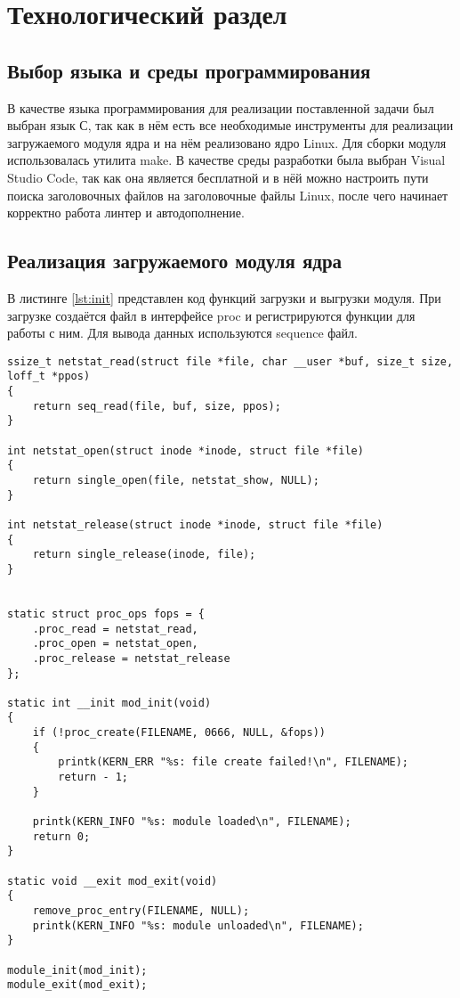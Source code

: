 \chapter{Технологический раздел}

\section{Выбор языка и среды программирования}

В качестве языка программирования для реализации поставленной задачи был выбран язык С, так как в нём есть все необходимые инструменты для реализации загружаемого модуля ядра и на нём реализовано ядро Linux. Для сборки модуля использовалась утилита make. В качестве среды разработки была выбран Visual Studio Code, так как она является бесплатной и в нёй можно настроить пути поиска заголовочных файлов на заголовочные файлы Linux, после чего начинает корректно работа линтер и автодополнение.

\section{Реализация загружаемого модуля ядра}

В листинге \ref{lst:init} представлен код функций загрузки и выгрузки модуля. При загрузке создаётся файл в интерфейсе proc и регистрируются функции для работы с ним. Для вывода данных используются sequence файл.
 
\begin{center}
	\captionsetup{justification=raggedright,singlelinecheck=off}
	\begin{lstlisting}[label=lst:init,caption=Функции инциализации и выгрузки модуля ,showstringspaces=false]
ssize_t netstat_read(struct file *file, char __user *buf, size_t size, loff_t *ppos)
{	
	return seq_read(file, buf, size, ppos);
}

int netstat_open(struct inode *inode, struct file *file)
{
	return single_open(file, netstat_show, NULL);
}

int netstat_release(struct inode *inode, struct file *file)
{
	return single_release(inode, file);
}


static struct proc_ops fops = {
	.proc_read = netstat_read,
	.proc_open = netstat_open,
	.proc_release = netstat_release
};

static int __init mod_init(void)
{
	if (!proc_create(FILENAME, 0666, NULL, &fops))
	{
		printk(KERN_ERR "%s: file create failed!\n", FILENAME);
		return - 1;
	}
	
	printk(KERN_INFO "%s: module loaded\n", FILENAME);
	return 0;
}

static void __exit mod_exit(void)
{
	remove_proc_entry(FILENAME, NULL);
	printk(KERN_INFO "%s: module unloaded\n", FILENAME);
}

module_init(mod_init);
module_exit(mod_exit);
	\end{lstlisting}
\end{center}
\FloatBarrier

